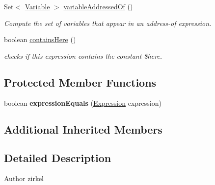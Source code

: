 \begin{DoxyCompactItemize}
Set$<$ \hyperlink{interfaceedu_1_1udel_1_1cis_1_1vsl_1_1civl_1_1model_1_1IF_1_1variable_1_1Variable}{Variable} $>$ \hyperlink{classedu_1_1udel_1_1cis_1_1vsl_1_1civl_1_1model_1_1common_1_1expression_1_1CommonConditionalExpression_aea9e80bede4fdd15ab76cda0eee0d2a4}{variable\+Addressed\+Of} ()
\begin{DoxyCompactList}\small\item\em Compute the set of variables that appear in an address-\/of expression. \end{DoxyCompactList}\item 
boolean \hyperlink{classedu_1_1udel_1_1cis_1_1vsl_1_1civl_1_1model_1_1common_1_1expression_1_1CommonConditionalExpression_afe0c000c2b1deb9995ecc6b3f727f2b8}{contains\+Here} ()
\begin{DoxyCompactList}\small\item\em checks if this expression contains the constant \$here. \end{DoxyCompactList}\end{DoxyCompactItemize}
\subsection*{Protected Member Functions}
\begin{DoxyCompactItemize}
\item 
\hypertarget{classedu_1_1udel_1_1cis_1_1vsl_1_1civl_1_1model_1_1common_1_1expression_1_1CommonConditionalExpression_a32081f9ccec0ffa828fc25f42b899556}{}boolean {\bfseries expression\+Equals} (\hyperlink{interfaceedu_1_1udel_1_1cis_1_1vsl_1_1civl_1_1model_1_1IF_1_1expression_1_1Expression}{Expression} expression)\label{classedu_1_1udel_1_1cis_1_1vsl_1_1civl_1_1model_1_1common_1_1expression_1_1CommonConditionalExpression_a32081f9ccec0ffa828fc25f42b899556}

\end{DoxyCompactItemize}
\subsection*{Additional Inherited Members}


\subsection{Detailed Description}
\begin{DoxyAuthor}{Author}
zirkel 
\end{DoxyAuthor}


